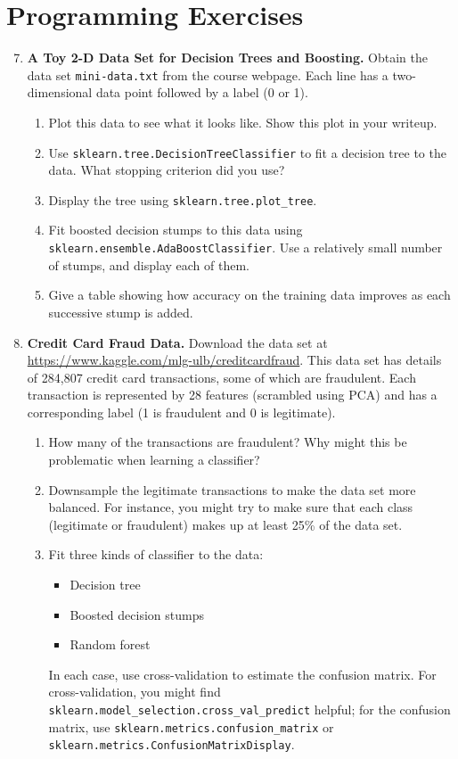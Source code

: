 \documentclass[11pt]{article}
\begin{document}
\section*{Programming Exercises}

\begin{enumerate}
  \setcounter{enumi}{6}
  \item \textbf{A Toy 2-D Data Set for Decision Trees and Boosting.} Obtain the data set \texttt{mini-data.txt} from the course webpage. Each line has a two-dimensional data point followed by a label (0 or 1).
    \begin{enumerate}
      \item Plot this data to see what it looks like. Show this plot in your writeup.
      \item Use \texttt{sklearn.tree.DecisionTreeClassifier} to fit a decision tree to the data. What stopping criterion did you use?
      \item Display the tree using \texttt{sklearn.tree.plot\_tree}.
      \item Fit boosted decision stumps to this data using \texttt{sklearn.ensemble.AdaBoostClassifier}. Use a relatively small number of stumps, and display each of them.
      \item Give a table showing how accuracy on the training data improves as each successive stump is added.
    \end{enumerate}

  \item \textbf{Credit Card Fraud Data.} Download the data set at \url{https://www.kaggle.com/mlg-ulb/creditcardfraud}. This data set has details of 284,807 credit card transactions, some of which are fraudulent. Each transaction is represented by 28 features (scrambled using PCA) and has a corresponding label (1 is fraudulent and 0 is legitimate).
    \begin{enumerate}
      \item How many of the transactions are fraudulent? Why might this be problematic when learning a classifier?
      \item Downsample the legitimate transactions to make the data set more balanced. For instance, you might try to make sure that each class (legitimate or fraudulent) makes up at least 25\% of the data set.
      \item Fit three kinds of classifier to the data:
        \begin{itemize}
          \item Decision tree
          \item Boosted decision stumps
          \item Random forest
        \end{itemize}
      In each case, use cross-validation to estimate the confusion matrix. For cross-validation, you might find \texttt{sklearn.model\_selection.cross\_val\_predict} helpful; for the confusion matrix, use \texttt{sklearn.metrics.confusion\_matrix} or \texttt{sklearn.metrics.ConfusionMatrixDisplay}.
    \end{enumerate}
\end{enumerate}
\end{document}
